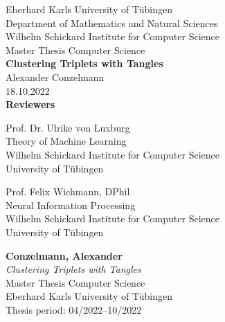 \documentclass[twoside,12pt,a4paper]{report}
\begin{document}
 
\begin{titlepage}
 \begin{center}
  {\LARGE Eberhard Karls University of T\"ubingen}\\
  {\large Department of Mathematics and Natural Sciences \\
Wilhelm Schickard Institute for Computer Science\\[4cm]}
  {\huge Master Thesis Computer Science\\[2cm]}
  {\Large\bf  Clustering Triplets with Tangles \\[1.5cm]}
 {\large Alexander Conzelmann}\\[0.5cm]
18.10.2022\\[4cm]
{\small\bf Reviewers}\\[0.5cm]
  \parbox{7cm}{\begin{center}{\large Prof. Dr. Ulrike von Luxburg}\\
   Theory of Machine Learning\\
  {\footnotesize Wilhelm Schickard Institute for Computer Science\\
	University of T\"ubingen}\end{center}}\hfill\parbox{7cm}{\begin{center}
  {\large Prof. Felix Wichmann, DPhil}\\
  Neural Information Processing\\
  {\footnotesize Wilhelm Schickard Institute for Computer Science\\
	University of T\"ubingen}\end{center}
 }
  \end{center}
\end{titlepage}


\thispagestyle{empty}
\vspace*{\fill}
\begin{minipage}{11.2cm}
\textbf{Conzelmann, Alexander}\\
\emph{Clustering Triplets with Tangles}\\ Master Thesis Computer Science\\
Eberhard Karls University of T\"ubingen\\
Thesis period: 04/2022–10/2022
\end{minipage}
\newpage
\end{document}

